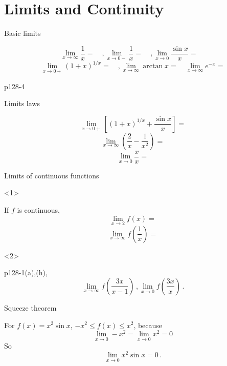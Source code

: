 \section[Limits]{Limits and Continuity}
\begin{frame}{Basic limits}


\[
\lim_{x\to\infty}\frac{1}{x}=\quad,\lim_{x\to0-}\frac{1}{x}=\quad,\lim_{x\to0}\frac{\sin x}{x}=\quad
\]
\[
\lim_{x\to0+}\left(1+x\right)^{1/x}=\quad,\lim_{x\to\infty}\arctan x=\quad\lim_{x\to\infty}e^{-x}=
\]

\begin{example}
p128-4
\end{example}

\end{frame}

\begin{frame}{Limits laws}


\[
\lim_{x\to0+}\left[\left(1+x\right)^{1/x}+\frac{\sin x}{x}\right]=
\]
\[
\lim_{x\to\infty}\left(\frac{2}{x}-\frac{1}{x^{2}}\right)=
\]
\[
\lim_{x\to0}\frac{x}{x}=
\]


\end{frame}

\begin{frame}{Limits of continuous functions}

\begin{onlyenv}<1>


If $f$ is continuous,
\[
\lim_{x\to2}f\left(x\right)=
\]
\[
\lim_{x\to\infty}f\left(\frac{1}{x}\right)=
\]


\end{onlyenv}



\begin{onlyenv}<2>

\begin{example}
p128-1(a),(h),
\[
\lim_{x\to\infty}f\left(\frac{3x}{x-1}\right)\,,\lim_{x\to0}f\left(\frac{3x}{x}\right)\,.
\]

\end{example}

\end{onlyenv}

\end{frame}

\begin{frame}{Squeeze theorem}


For $f\left(x\right)=x^{2}\sin x$, $-x^{2}\le f\left(x\right)\le x^{2}$,
because
\[
\lim_{x\to0}-x^{2}=\lim_{x\to0}x^{2}=0
\]
So
\[
\lim_{x\to0}x^{2}\sin x=0\,.
\]


\end{frame}

